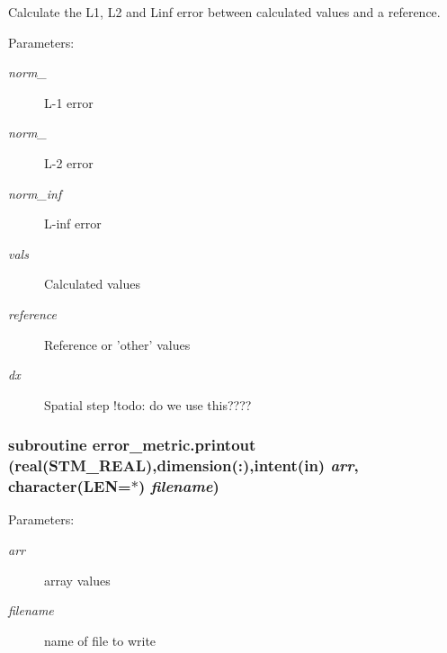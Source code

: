 Calculate the L1, L2 and Linf error between calculated values and a reference. 

\begin{Desc}
\item[Parameters:]
\begin{description}
\item[{\em norm\_}]L-1 error\item[{\em norm\_}]L-2 error\item[{\em norm\_\-inf}]L-inf error\item[{\em vals}]Calculated values\item[{\em reference}]Reference or 'other' values\item[{\em dx}]Spatial step !todo: do we use this???? \end{description}
\end{Desc}
\hypertarget{a00028_77cc70369d1c443b98ecf5a00f30f2ab}{
\subsubsection[{printout}]{\setlength{\rightskip}{0pt plus 5cm}subroutine error\_\-metric.printout (real(STM\_\-REAL),dimension(:),intent(in) {\em arr}, \/  character(LEN=$\ast$) {\em filename})}}
\label{a00028_77cc70369d1c443b98ecf5a00f30f2ab}


\begin{Desc}
\item[Parameters:]
\begin{description}
\item[{\em arr}]array values\item[{\em filename}]name of file to write \end{description}
\end{Desc}
